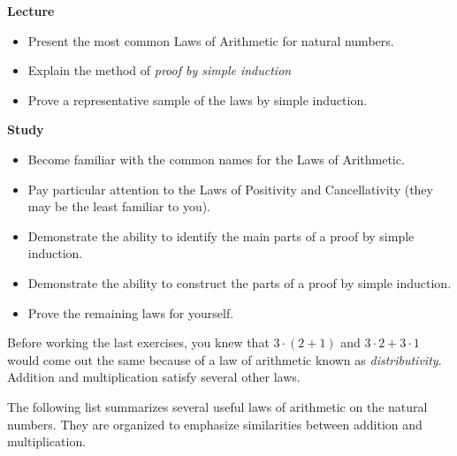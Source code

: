 \begin{goals}
\noindent\textbf{Lecture}
\begin{itemize}
\item Present the most common Laws of Arithmetic for natural numbers.
\item Explain the method of \emph{proof by simple induction}
\item Prove a representative sample of the laws by simple induction.
\end{itemize}
\noindent\textbf{Study}
\begin{itemize}
\item Become familiar with the common names for the Laws of Arithmetic.
\item Pay particular attention to the Laws of Positivity and Cancellativity (they may be the least familiar to you).
\item Demonstrate the ability to identify the main parts of a proof by simple induction.
\item Demonstrate the ability to construct the parts of a proof by simple induction.
\item Prove the remaining laws for yourself.
\end{itemize}
\end{goals}

Before working the last exercises, you knew that $3\cdot (2+1)$ and $3\cdot 2+ 3\cdot 1$
would come out the same because of a law of arithmetic known as \emph{distributivity}. 
Addition and multiplication satisfy several other laws.

\ipadbreak
\printbreak


The following list summarizes several useful laws of
arithmetic on the natural numbers. They are organized to emphasize
similarities between addition and multiplication.

